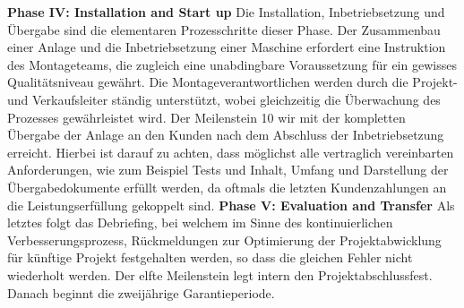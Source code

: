 \newline
\textbf{Phase IV: Installation and Start up}
\newline
Die Installation, Inbetriebsetzung und Übergabe sind die elementaren Prozesschritte dieser Phase. Der Zusammenbau einer Anlage und die Inbetriebsetzung einer Maschine erfordert eine Instruktion des Montageteams, die zugleich eine unabdingbare Voraussetzung für ein gewisses Qualitätsniveau gewährt. Die Montageverantwortlichen werden durch die Projekt- und Verkaufsleiter ständig unterstützt, wobei gleichzeitig die Überwachung des Prozesses gewährleistet wird. Der Meilenstein 10 wir mit der kompletten Übergabe der Anlage an den Kunden nach dem Abschluss der Inbetriebsetzung erreicht. Hierbei ist darauf zu achten, dass möglichst alle vertraglich vereinbarten Anforderungen, wie zum Beispiel Tests und Inhalt, Umfang und Darstellung der Übergabedokumente erfüllt werden, da oftmals die letzten Kundenzahlungen an die Leistungserfüllung gekoppelt sind. 
\newline
\textbf{Phase V: Evaluation and Transfer}
\newline
Als letztes folgt das Debriefing, bei welchem im Sinne des kontinuierlichen Verbesserungsprozess, Rückmeldungen zur Optimierung der Projektabwicklung für künftige Projekt festgehalten werden, so dass die gleichen Fehler nicht wiederholt  werden. Der elfte Meilenstein legt intern den Projektabschlussfest. Danach beginnt die zweijährige Garantieperiode. 

